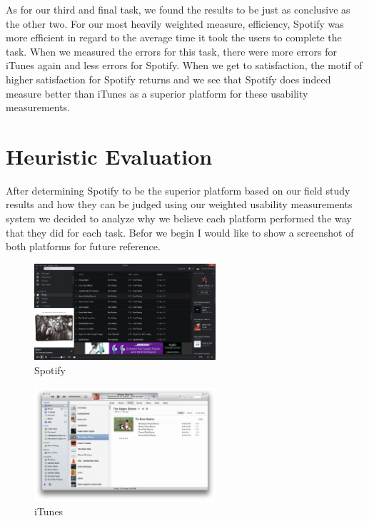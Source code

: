 \documentclass[a4paper]{article}
\begin{document}
As for our third and final task, we found the results to be just as conclusive as the other two. For our most heavily weighted measure, efficiency, Spotify was more efficient in regard to the average time it took the users to complete the task. When we measured the errors for this task, there were more errors for iTunes again and less errors for Spotify. When we get to satisfaction, the motif of higher satisfaction for Spotify returns and we see that Spotify does indeed measure better than iTunes as a superior platform for these usability measurements.



\section{Heuristic Evaluation}

After determining Spotify to be the superior platform based on our field study results and how they can be judged using our weighted usability measurements system we decided to analyze why we believe each platform performed the way that they did for each task. Befor we begin I would like to show a screenshot of both platforms for future reference.

\begin{figure}[H]
\centering
\includegraphics[width=0.6\textwidth]{spotify.PNG}
\caption{\label{task:spotify}Spotify}
\end{figure}
\begin{figure}[H]
\centering
\includegraphics[width=0.6\textwidth]{itunes.jpg}
\caption{\label{task:iTunes}iTunes}
\end{figure}
\end{document}
